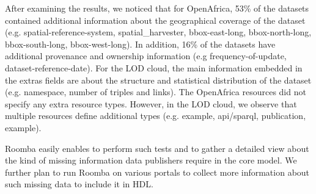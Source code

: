 \documentclass[runningheads,a4paper]{../../Tools/LaTEX/llncs}
\begin{document}
After examining the results, we noticed that for OpenAfrica, 53\% of the datasets contained additional information about the geographical coverage of the dataset (e.g. spatial-reference-system, spatial\_harvester, bbox-east-long, bbox-north-long, bbox-south-long, bbox-west-long). In addition, 16\% of the datasets have additional provenance and ownership information (e.g frequency-of-update, dataset-reference-date). For the LOD cloud, the main information embedded in the extras fields are about the structure and statistical distribution of the dataset (e.g. namespace, number of triples and links). The OpenAfrica resources did not specify any extra resource types. However, in the LOD cloud, we observe that multiple resources define additional types (e.g. example, api/sparql, publication, example).

Roomba easily enables to perform such tests and to gather a detailed view about the kind of missing information data publishers require in the core model. We further plan to run Roomba on various portals to collect more information about such missing data to include it in HDL.
\end{document}
